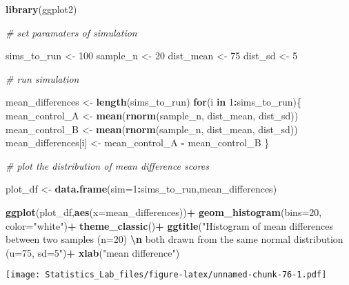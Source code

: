 \documentclass[
]{book}
\newenvironment{Shaded}{\begin{snugshade}}{\end{snugshade}}
\newcommand{\AttributeTok}[1]{\textcolor[rgb]{0.13,0.29,0.53}{#1}}
\newcommand{\CommentTok}[1]{\textcolor[rgb]{0.56,0.35,0.01}{\textit{#1}}}
\newcommand{\ControlFlowTok}[1]{\textcolor[rgb]{0.13,0.29,0.53}{\textbf{#1}}}
\newcommand{\DecValTok}[1]{\textcolor[rgb]{0.00,0.00,0.81}{#1}}
\newcommand{\FunctionTok}[1]{\textcolor[rgb]{0.13,0.29,0.53}{\textbf{#1}}}
\newcommand{\NormalTok}[1]{#1}
\newcommand{\OtherTok}[1]{\textcolor[rgb]{0.56,0.35,0.01}{#1}}
\newcommand{\SpecialCharTok}[1]{\textcolor[rgb]{0.81,0.36,0.00}{\textbf{#1}}}
\newcommand{\StringTok}[1]{\textcolor[rgb]{0.31,0.60,0.02}{#1}}
\begin{document}
\begin{Shaded}
\begin{Highlighting}[]
\FunctionTok{library}\NormalTok{(ggplot2)}

\CommentTok{\# set paramaters of simulation}

\NormalTok{sims\_to\_run }\OtherTok{\textless{}{-}} \DecValTok{100}
\NormalTok{sample\_n   }\OtherTok{\textless{}{-}} \DecValTok{20}
\NormalTok{dist\_mean  }\OtherTok{\textless{}{-}} \DecValTok{75}
\NormalTok{dist\_sd    }\OtherTok{\textless{}{-}} \DecValTok{5}

\CommentTok{\# run simulation}

\NormalTok{mean\_differences }\OtherTok{\textless{}{-}} \FunctionTok{length}\NormalTok{(sims\_to\_run)}
\ControlFlowTok{for}\NormalTok{(i }\ControlFlowTok{in} \DecValTok{1}\SpecialCharTok{:}\NormalTok{sims\_to\_run)\{}
\NormalTok{  mean\_control\_A      }\OtherTok{\textless{}{-}} \FunctionTok{mean}\NormalTok{(}\FunctionTok{rnorm}\NormalTok{(sample\_n, dist\_mean, dist\_sd))}
\NormalTok{  mean\_control\_B      }\OtherTok{\textless{}{-}} \FunctionTok{mean}\NormalTok{(}\FunctionTok{rnorm}\NormalTok{(sample\_n, dist\_mean, dist\_sd))}
\NormalTok{  mean\_differences[i] }\OtherTok{\textless{}{-}}\NormalTok{ mean\_control\_A }\SpecialCharTok{{-}}\NormalTok{ mean\_control\_B}
\NormalTok{\}}

\CommentTok{\# plot the  distribution of mean difference scores}

\NormalTok{plot\_df }\OtherTok{\textless{}{-}} \FunctionTok{data.frame}\NormalTok{(}\AttributeTok{sim=}\DecValTok{1}\SpecialCharTok{:}\NormalTok{sims\_to\_run,mean\_differences)}

\FunctionTok{ggplot}\NormalTok{(plot\_df,}\FunctionTok{aes}\NormalTok{(}\AttributeTok{x=}\NormalTok{mean\_differences))}\SpecialCharTok{+}
  \FunctionTok{geom\_histogram}\NormalTok{(}\AttributeTok{bins=}\DecValTok{20}\NormalTok{, }\AttributeTok{color=}\StringTok{"white"}\NormalTok{)}\SpecialCharTok{+}
  \FunctionTok{theme\_classic}\NormalTok{()}\SpecialCharTok{+}
  \FunctionTok{ggtitle}\NormalTok{(}\StringTok{"Histogram of mean differences between two samples (n=20) }\SpecialCharTok{\textbackslash{}n}
\StringTok{          both drawn from the same normal distribution (u=75, sd=5"}\NormalTok{)}\SpecialCharTok{+}
  \FunctionTok{xlab}\NormalTok{(}\StringTok{"mean difference"}\NormalTok{)}
\end{Highlighting}
\end{Shaded}

\texttt{[image: Statistics\_Lab\_files/figure-latex/unnamed-chunk-76-1.pdf]}
\end{document}
